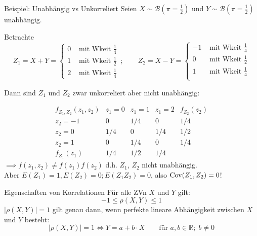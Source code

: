 \documentclass[
  10pt,
  ignorenonframetext,
]{beamer}
\begin{document}
\begin{frame}{Beispiel: Unabhängig vs Unkorreliert}
\protect\hypertarget{beispiel-unabhuxe4ngig-vs-unkorreliert}{}
Seien \(X \sim {\mathcal B}(\pi = \frac{1}{2})\) und
\(Y \sim {\mathcal B}(\pi = \frac{1}{2})\) unabhängig.

Betrachte \[
Z_1  =   X + Y = \left \{ \begin{array}{rl}
0 & \mbox{ mit Wkeit }\frac{1}{4}\\
1 & \mbox{ mit Wkeit }\frac{1}{2}\\
2 & \mbox{ mit Wkeit }\frac{1}{4}
\end{array}
\right.\,;  \qquad 
Z_2 =   X - Y = \left \{ \begin{array}{rl}
-1 & \mbox{ mit Wkeit }\frac{1}{4}\\
0 & \mbox{ mit Wkeit }\frac{1}{2}\\
1 & \mbox{ mit Wkeit }\frac{1}{4}\\
\end{array}
\right.
\]

Dann sind \(Z_1\) und \(Z_2\) zwar unkorreliert aber nicht unabhängig:

\[\begin{array}{c|ccc|c}
f_{Z_1,Z_2}(z_1,z_2) & z_1 = 0 & z_1 = 1 & z_1 = 2 &
f_{Z_2}(z_2)\\ \hline 
z_2 = -1 & 0 & 1/4 & 0 & 1/4 \\
z_2 = 0 & 1/4 & 0 & 1/4 & 1/2 \\
z_2 = 1 & 0 & 1/4 & 0 & 1/4 \\ \hline
f_{Z_1}(z_1) & 1/4 & 1/2 & 1/4 & 
\end{array}\] \(\implies f(z_1,z_2) \neq f(z_1) f(z_2)\) d.h. \(Z_1\),
\(Z_2\) nicht unabhängig.\\
Aber \(E(Z_1) = 1, E(Z_2) = 0; E(Z_1 Z_2) = 0\), also
\(\operatorname{Cov}(Z_1,Z_2) = 0\)!
\end{frame}

\begin{frame}{Eigenschaften von Korrelationen}
\protect\hypertarget{eigenschaften-von-korrelationen}{}
Für alle ZVn \(X\) und \(Y\) gilt: \[
-1 \leq \rho(X,Y) \leq 1
\] \(|\rho(X,Y)| = 1\) gilt genau dann, wenn perfekte lineare
Abhängigkeit zwischen \(X\) und \(Y\) besteht: \[
|\rho(X,Y)| = 1 \iff Y = a + b \cdot X \qquad \mbox{für } a,b \in \mathbb{R};\; b \neq 0 
\]
\end{frame}
\end{document}
